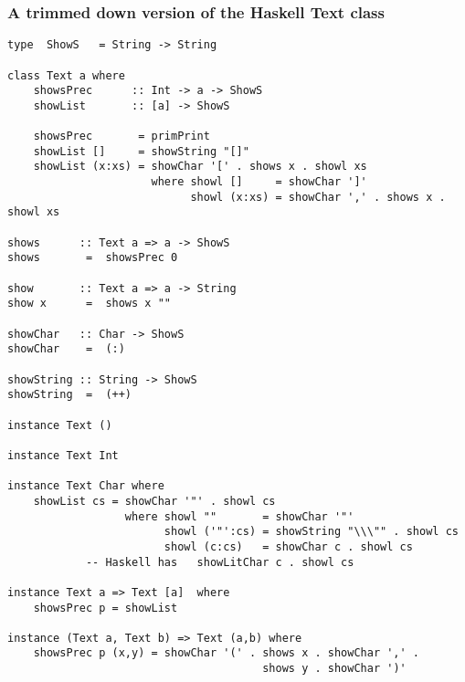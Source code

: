 \subsubsection*{A trimmed down version of the Haskell Text class}
\begin{verbatim}
type  ShowS   = String -> String

class Text a where 
    showsPrec      :: Int -> a -> ShowS
    showList       :: [a] -> ShowS

    showsPrec       = primPrint
    showList []     = showString "[]"
    showList (x:xs) = showChar '[' . shows x . showl xs
                      where showl []     = showChar ']'
                            showl (x:xs) = showChar ',' . shows x . showl xs

shows      :: Text a => a -> ShowS
shows       =  showsPrec 0

show       :: Text a => a -> String
show x      =  shows x ""

showChar   :: Char -> ShowS
showChar    =  (:)

showString :: String -> ShowS
showString  =  (++)

instance Text ()

instance Text Int

instance Text Char where
    showList cs = showChar '"' . showl cs
                  where showl ""       = showChar '"'
                        showl ('"':cs) = showString "\\\"" . showl cs
                        showl (c:cs)   = showChar c . showl cs
			-- Haskell has   showLitChar c . showl cs

instance Text a => Text [a]  where
    showsPrec p = showList

instance (Text a, Text b) => Text (a,b) where
    showsPrec p (x,y) = showChar '(' . shows x . showChar ',' .
                                       shows y . showChar ')'
\end{verbatim}
